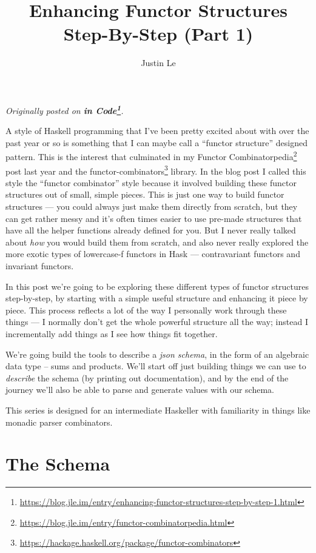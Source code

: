 \documentclass[]{article}
\title{Enhancing Functor Structures Step-By-Step (Part 1)}
\author{Justin Le}
\renewcommand{\href}[2]{#2\footnote{\url{#1}}}
\begin{document}
\maketitle

\emph{Originally posted on
\textbf{\href{https://blog.jle.im/entry/enhancing-functor-structures-step-by-step-1.html}{in
Code}}.}

A style of Haskell programming that I've been pretty excited about with over the
past year or so is something that I can maybe call a ``functor structure''
designed pattern. This is the interest that culminated in my
\href{https://blog.jle.im/entry/functor-combinatorpedia.html}{Functor
Combinatorpedia} post last year and the
\href{https://hackage.haskell.org/package/functor-combinators}{functor-combinators}
library. In the blog post I called this style the ``functor combinator'' style
because it involved building these functor structures out of small, simple
pieces. This is just one way to build functor structures --- you could always
just make them directly from scratch, but they can get rather messy and it's
often times easier to use pre-made structures that have all the helper functions
already defined for you. But I never really talked about \emph{how} you would
build them from scratch, and also never really explored the more exotic types of
lowercase-f functors in Hask --- contravariant functors and invariant functors.

In this post we're going to be exploring these different types of functor
structures step-by-step, by starting with a simple useful structure and
enhancing it piece by piece. This process reflects a lot of the way I personally
work through these things --- I normally don't get the whole powerful structure
all the way; instead I incrementally add things as I see how things fit
together.

We're going build the tools to describe a \emph{json schema}, in the form of an
algebraic data type -- sums and products. We'll start off just building things
we can use to \emph{describe} the schema (by printing out documentation), and by
the end of the journey we'll also be able to parse and generate values with our
schema.

This series is designed for an intermediate Haskeller with familiarity in things
like monadic parser combinators.

\hypertarget{the-schema}{%
\section{The Schema}\label{the-schema}}
\end{document}
